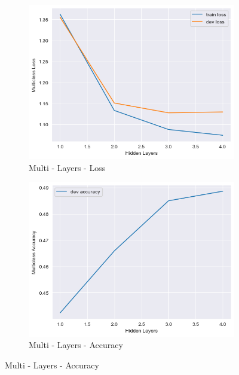 \documentclass[12pt]{article}
\theoremstyle{definitionstyle}
\begin{document}
\begin{enumerate}
\begin{figure}[H]
            \begin{subfigure}{0.35\textwidth}
                \includegraphics[width=\textwidth]{images/multi_layers_loss.png}
                \caption{Multi - Layers - Loss}
            \end{subfigure}
            \hfill
            \begin{subfigure}{0.35\textwidth}
                \includegraphics[width=\textwidth]{images/multi_layers_acc.png}
                \caption{Multi - Layers - Accuracy}
            \end{subfigure}
            \label{fig:graphs}
        \end{figure}


\end{enumerate}
\end{document}
